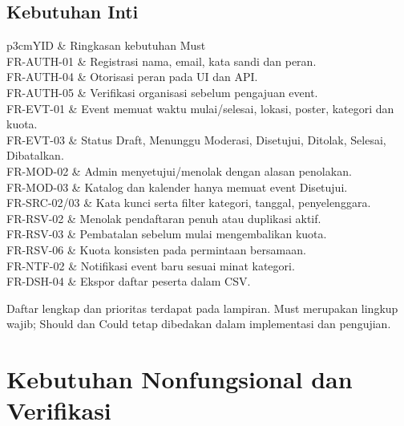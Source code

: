 \documentclass[11pt,a4paper]{article}
\newcommand{\tbl}[2]{\par\smallskip\noindent\begin{tabularx}{\linewidth}{#1}\toprule #2\bottomrule\end{tabularx}\par\smallskip}
\newcommand{\page}[1]{\clearpage\section{#1}}
\begin{document}
\subsection{Kebutuhan Inti}
\tbl{p{3cm}Y}{ID & Ringkasan kebutuhan Must\\\midrule
FR-AUTH-01 & Registrasi nama, email, kata sandi dan peran.\\
FR-AUTH-04 & Otorisasi peran pada UI dan API.\\
FR-AUTH-05 & Verifikasi organisasi sebelum pengajuan event.\\
FR-EVT-01 & Event memuat waktu mulai/selesai, lokasi, poster, kategori dan kuota.\\
FR-EVT-03 & Status Draft, Menunggu Moderasi, Disetujui, Ditolak, Selesai, Dibatalkan.\\
FR-MOD-02 & Admin menyetujui/menolak dengan alasan penolakan.\\
FR-MOD-03 & Katalog dan kalender hanya memuat event Disetujui.\\
FR-SRC-02/03 & Kata kunci serta filter kategori, tanggal, penyelenggara.\\
FR-RSV-02 & Menolak pendaftaran penuh atau duplikasi aktif.\\
FR-RSV-03 & Pembatalan sebelum mulai mengembalikan kuota.\\
FR-RSV-06 & Kuota konsisten pada permintaan bersamaan.\\
FR-NTF-02 & Notifikasi event baru sesuai minat kategori.\\
FR-DSH-04 & Ekspor daftar peserta dalam CSV.\\}
Daftar lengkap dan prioritas terdapat pada lampiran. Must merupakan lingkup wajib; Should dan Could tetap dibedakan dalam implementasi dan pengujian.
\page{Kebutuhan Nonfungsional dan Verifikasi}
\end{document}
